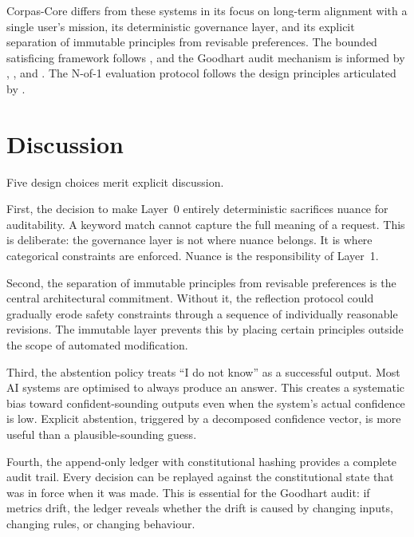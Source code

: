 \documentclass[11pt,a4paper]{article}
\begin{document}
Corpas-Core differs from these systems in its focus on long-term alignment with a single user's mission, its deterministic governance layer, and its explicit separation of immutable principles from revisable preferences. The bounded satisficing framework follows \citet{simon1956rational}, and the Goodhart audit mechanism is informed by \citet{goodhart1975problems}, \citet{strathern1997improving}, and \citet{manheim2018goodhart}. The N-of-1 evaluation protocol follows the design principles articulated by \citet{lillie2011nof1}.

\section{Discussion}

Five design choices merit explicit discussion.

First, the decision to make Layer~0 entirely deterministic sacrifices nuance for auditability. A keyword match cannot capture the full meaning of a request. This is deliberate: the governance layer is not where nuance belongs. It is where categorical constraints are enforced. Nuance is the responsibility of Layer~1.

Second, the separation of immutable principles from revisable preferences is the central architectural commitment. Without it, the reflection protocol could gradually erode safety constraints through a sequence of individually reasonable revisions. The immutable layer prevents this by placing certain principles outside the scope of automated modification.

Third, the abstention policy treats ``I do not know'' as a successful output. Most AI systems are optimised to always produce an answer. This creates a systematic bias toward confident-sounding outputs even when the system's actual confidence is low. Explicit abstention, triggered by a decomposed confidence vector, is more useful than a plausible-sounding guess.

Fourth, the append-only ledger with constitutional hashing provides a complete audit trail. Every decision can be replayed against the constitutional state that was in force when it was made. This is essential for the Goodhart audit: if metrics drift, the ledger reveals whether the drift is caused by changing inputs, changing rules, or changing behaviour.
\end{document}
